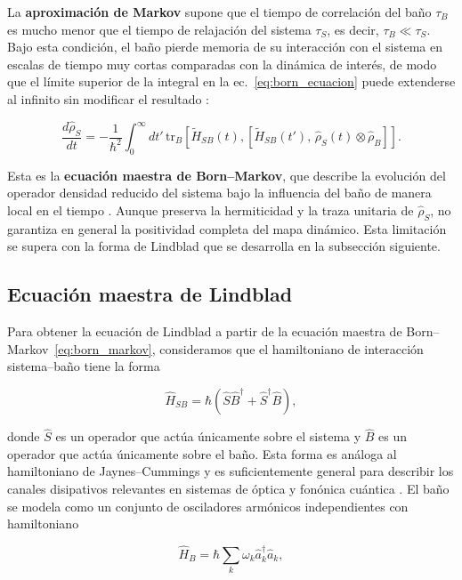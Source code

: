 La \textbf{aproximación de Markov} supone que el tiempo de correlación del baño $\tau_B$ es mucho menor que el tiempo de relajación del sistema $\tau_S$, es decir, $\tau_B \ll \tau_S$. Bajo esta condición, el baño pierde memoria de su interacción con el sistema en escalas de tiempo muy cortas comparadas con la dinámica de interés, de modo que el límite superior de la integral en la ec.~\eqref{eq:born_ecuacion} puede extenderse al infinito sin modificar el resultado \cite{brasil2013}:

\begin{equation}
	\frac{d\hat{\rho}_S}{dt} = -\frac{1}{\hbar^2}\int_0^\infty dt'\,
	\mathrm{tr}_B\!\left[\tilde{H}_{SB}(t),\left[\tilde{H}_{SB}(t'),\,
	\hat{\rho}_S(t)\otimes\hat{\rho}_B\right]\right].
	\label{eq:born_markov}
\end{equation}

Esta es la \textbf{ecuación maestra de Born--Markov}, que describe la evolución del operador densidad reducido del sistema bajo la influencia del baño de manera local en el tiempo \cite{brasil2013,breuerpetruccione2002}. Aunque preserva la hermiticidad y la traza unitaria de $\hat{\rho}_S$, no garantiza en general la positividad completa del mapa dinámico. Esta limitación se supera con la forma de Lindblad que se desarrolla en la subsección siguiente.

\subsection{Ecuación maestra de Lindblad}
\label{sec:lindblad}

Para obtener la ecuación de Lindblad a partir de la ecuación maestra de Born--Markov~\eqref{eq:born_markov}, consideramos que el hamiltoniano de interacción sistema--baño tiene la forma

\begin{equation}
	\hat{H}_{SB} = \hbar\left(\hat{S}\hat{B}^\dagger +
	\hat{S}^\dagger\hat{B}\right),
	\label{eq:H_SB}
\end{equation}

donde $\hat{S}$ es un operador que actúa únicamente sobre el sistema y $\hat{B}$ es un operador que actúa únicamente sobre el baño. Esta forma es análoga al hamiltoniano de Jaynes--Cummings y es suficientemente general para describir los canales disipativos relevantes en sistemas de óptica y fonónica cuántica \cite{brasil2013}. El baño se modela como un conjunto de osciladores armónicos independientes con hamiltoniano

\begin{equation}
	\hat{H}_B = \hbar\sum_k \omega_k\hat{a}_k^\dagger\hat{a}_k,
	\label{eq:H_B}
\end{equation}

